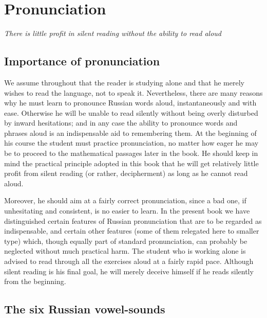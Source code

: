 \chapter{Pronunciation}

\begin{sourcebox}
\centering\itshape
There is little profit in silent reading without the ability to read aloud
\end{sourcebox}

\section{Importance of pronunciation}

We assume throughout that the reader is studying alone and that he merely wishes to read the language, not to speak it. Nevertheless, there are many reasons why he must learn to pronounce Russian words aloud, instantaneously and with ease. Otherwise he will be unable to read silently without being overly disturbed by inward hesitations; and in any case the ability to pronounce words and phrases aloud is an indispensable aid to remembering them. At the beginning of his course the student must practice pronunciation, no matter how eager he may be to proceed to the mathematical passages later in the book. He should keep in mind the practical principle adopted in this book that he will get relatively little profit from silent reading (or rather, decipherment) as long as he cannot read aloud.

Moreover, he should aim at a fairly correct pronunciation, since a bad one, if unhesitating and consistent, is no easier to learn. In the present book we have distinguished certain features of Russian pronunciation that are to be regarded as indispensable, and certain other features (some of them relegated here to smaller type) which, though equally part of standard pronunciation, can probably be neglected without much practical harm. The student who is working alone is advised to read through all the exercises aloud at a fairly rapid pace. Although silent reading is his final goal, he will merely deceive himself if he reads silently from the beginning.

\section{The six Russian vowel-sounds}

